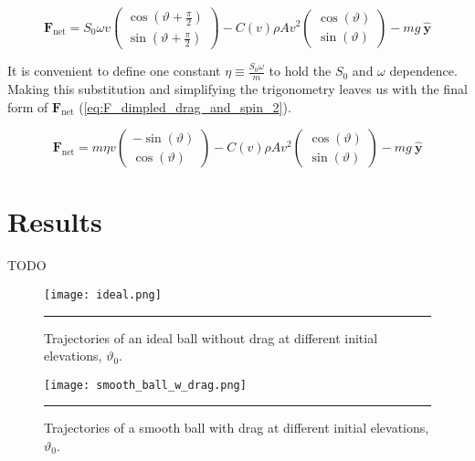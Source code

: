 \documentclass[notitlepage,aps,prd,nofootinbib]{revtex4-1}
\begin{document}
\begin{equation} \label{eq:F_dimpled_drag_and_spin}
\mathbf{F}_{\text{net}} = S_{0} \omega v 
\begin{pmatrix}
  \cos(\vartheta + \frac{\pi}{2}) \\
  \sin(\vartheta + \frac{\pi}{2})
\end{pmatrix}
- C\left(v\right) \rho A v^{2}
\begin{pmatrix}
  \cos(\vartheta) \\
  \sin(\vartheta)
\end{pmatrix}
-m g~\hat{\mathbf{y}}
\end{equation}

It is convenient to define one constant $\eta \equiv \frac{S_{0} \omega}{m}$ to hold the $S_{0}$ and $\omega$ dependence. Making this substitution and simplifying the trigonometry leaves us with the final form of $\mathbf{F}_{\text{net}}$ (\ref{eq:F_dimpled_drag_and_spin_2}). 

\begin{equation} \label{eq:F_dimpled_drag_and_spin_2}
\mathbf{F}_{\text{net}} = m \eta v 
\begin{pmatrix}
  -\sin(\vartheta) \\
  \cos(\vartheta)
\end{pmatrix}
- C\left(v\right) \rho A v^{2}
\begin{pmatrix}
  \cos(\vartheta) \\
  \sin(\vartheta)
\end{pmatrix}
-m g~\hat{\mathbf{y}}
\end{equation}


\section{Results}
\label{sec:results}
TODO

\begin{figure}[!htbc]
  \centering
  \texttt{[image: ideal.png]}
	{\par\nobreak\rule[9pt]{35em}{0.5pt}\vspace{-5mm}}
	\caption{Trajectories of an ideal ball without drag at different initial elevations, $\vartheta_{0}$.}
	\label{fig:ideal}
\end{figure}



\begin{figure}[!htbc]
  \centering
  \texttt{[image: smooth\_ball\_w\_drag.png]}
	{\par\nobreak\rule[9pt]{35em}{0.5pt}\vspace{-5mm}}
	\caption{Trajectories of a smooth ball with drag at different initial elevations, $\vartheta_{0}$.}
	\label{fig:smooth_ball_w_drag}
\end{figure}
\end{document}

